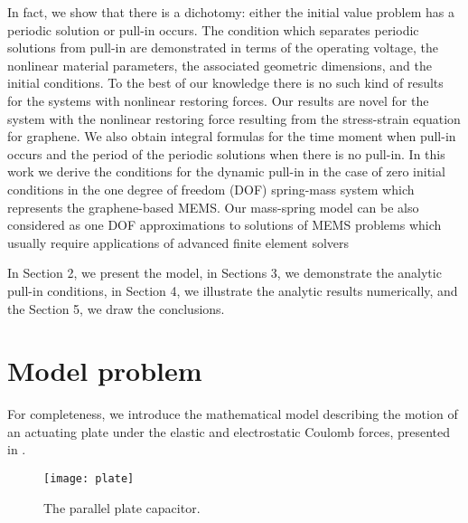 \documentclass[review]{elsarticle}
\begin{document}
In fact, we show that there is a dichotomy: either the initial value problem has a periodic solution or pull-in occurs. The condition which separates periodic solutions from pull-in are demonstrated in terms of the operating voltage, the nonlinear material parameters, the associated geometric dimensions, and the initial conditions. To the best of our knowledge there is no such kind of results for the systems with nonlinear restoring forces. Our results are novel for the system with the nonlinear restoring force resulting from the stress-strain equation for graphene.  We also obtain integral formulas for the time moment when pull-in occurs and the period of the periodic solutions when there is no pull-in.
In this work we derive the conditions for the dynamic pull-in in the case of zero initial conditions in the one degree of freedom (DOF) spring-mass system which represents the graphene-based MEMS. Our mass-spring model can be also considered as one DOF approximations to solutions of MEMS problems which usually require applications of advanced finite element solvers

In Section 2, we present the model, in Sections 3, we demonstrate the analytic pull-in conditions, in Section 4, we illustrate the analytic results numerically, and the Section 5, we draw the conclusions.
\section{{M}odel problem}
For completeness, we introduce the mathematical model describing the motion of an actuating
plate under the elastic and electrostatic Coulomb forces, presented  in \cite{dongming}.
\begin{figure}[htb]
\begin{center}
    \texttt{[image: plate]}
    \caption{The parallel plate capacitor.}\label{fig_1}
  \end{center}
\end{figure}
\end{document}
